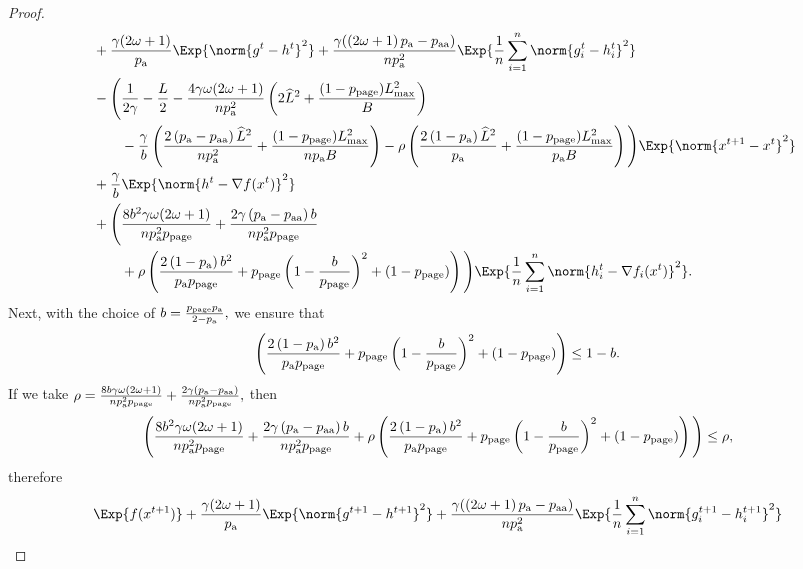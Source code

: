 \documentclass{article}
\newcommand*{\probavailable}{\ensuremath{p_{\textnormal{a}}}}
\newcommand*{\probpairaa}{\ensuremath{p_{\textnormal{aa}}}}
\newcommand*{\probpage}{\ensuremath{p_{\text{page}}}}
\begin{document}
\begin{proof}
\begin{align*}
      &\quad + \frac{\gamma (2 \omega + 1)}{\probavailable} \Exp{\norm{g^{t} - h^{t}}^2} + \frac{\gamma (\left(2 \omega + 1\right)\probavailable - \probpairaa)}{n \probavailable^2} \Exp{\frac{1}{n}\sum_{i=1}^n\norm{g^{t}_i - h^{t}_i}^2} \\
      &\quad - \Bigg(\frac{1}{2\gamma} - \frac{L}{2} - \frac{4 \gamma \omega (2 \omega + 1)}{n \probavailable^2} \left(2 \widehat{L}^2 + \frac{(1 - \probpage)L_{\max}^2}{B}\right) \\
      &\qquad\quad - \frac{\gamma}{b}\left(\frac{2 \left(\probavailable - \probpairaa\right) \widehat{L}^2}{n \probavailable^2} + \frac{(1 - \probpage)L_{\max}^2}{n \probavailable B}\right) - \rho \left(\frac{2\left(1 - \probavailable\right)\widehat{L}^2}{\probavailable} + \frac{(1 - \probpage)L_{\max}^2}{\probavailable B}\right)\Bigg) \Exp{\norm{x^{t+1} - x^t}^2} \\
      &\quad + \frac{\gamma}{b}\Exp{\norm{h^{t} - \nabla f(x^{t})}^2} \\
      &\quad + \Bigg(\frac{8 b^2 \gamma \omega (2 \omega + 1)}{n \probavailable^2 \probpage} + \frac{2 \gamma \left(\probavailable - \probpairaa\right) b}{n \probavailable^2 \probpage} \\
      &\qquad\quad+ \rho \left(\frac{2\left(1 - \probavailable\right)b^2}{\probavailable \probpage} + \probpage\left(1 - \frac{b}{\probpage}\right)^2 + (1 - \probpage)\right)\Bigg)\Exp{\frac{1}{n}\sum_{i=1}^n\norm{h^{t}_i - \nabla f_i(x^{t})}^2}.
    \end{align*}
    Next, with the choice of $b = \frac{\probpage \probavailable}{2 - \probavailable},$ we ensure that
    $$\left(\frac{2\left(1 - \probavailable\right)b^2}{\probavailable \probpage} + \probpage\left(1 - \frac{b}{\probpage}\right)^2 + (1 - \probpage)\right) \leq 1 - b.$$ If we take $\rho = \frac{8 b \gamma \omega (2 \omega + 1)}{n \probavailable^2 \probpage} + \frac{2 \gamma \left(\probavailable - \probpairaa\right)}{n \probavailable^2 \probpage},$ then
    $$\Bigg(\frac{8 b^2 \gamma \omega (2 \omega + 1)}{n \probavailable^2 \probpage} + \frac{2 \gamma \left(\probavailable - \probpairaa\right) b}{n \probavailable^2 \probpage}+ \rho \left(\frac{2\left(1 - \probavailable\right)b^2}{\probavailable \probpage} + \probpage\left(1 - \frac{b}{\probpage}\right)^2 + (1 - \probpage)\right)\Bigg) \leq \rho,$$ therefore
    \begin{align*}
      &\Exp{f(x^{t + 1})} + \frac{\gamma (2 \omega + 1)}{\probavailable} \Exp{\norm{g^{t+1} - h^{t+1}}^2} + \frac{\gamma (\left(2 \omega + 1\right)\probavailable - \probpairaa)}{n \probavailable^2} \Exp{\frac{1}{n}\sum_{i=1}^n\norm{g^{t+1}_i - h^{t+1}_i}^2}\\

\end{align*}
\end{proof}
\end{document}
